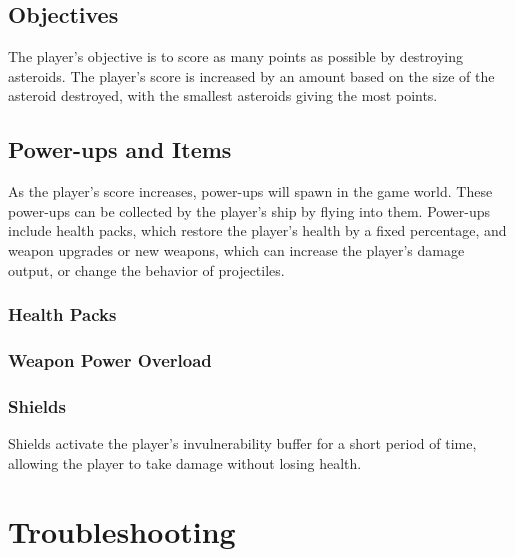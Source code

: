 \documentclass[12pt, a4paper]{article}
\begin{document}
\subsection{Objectives}

The player's objective is to score as many points as possible by destroying asteroids. The player's score is increased by an amount based on the size of the asteroid destroyed, with the smallest asteroids giving the most points.

\subsection{Power-ups and Items}

As the player's score increases, power-ups will spawn in the game world. These power-ups can be collected by the player's ship by flying into them. Power-ups include health packs, which restore the player's health by a fixed percentage, and weapon upgrades or new weapons, which can increase the player's damage output, or change the behavior of projectiles.

\subsubsection{Health Packs}

\subsubsection{Weapon Power Overload}

\subsubsection{Shields}

Shields activate the player's invulnerability buffer for a short period of time, allowing the player to take damage without losing health.

\section{Troubleshooting}
\end{document}
